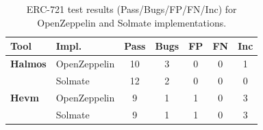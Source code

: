 \begin{table}[htb]
\centering
\begin{scriptsize}
\begin{tabular}{llccccc}
\toprule
\textbf{Tool} & \textbf{Impl.} & \textbf{Pass} & \textbf{Bugs} & \textbf{FP} & \textbf{FN} & \textbf{Inc} \\
\midrule
\textbf{Halmos} & OpenZeppelin & 10 & 3 & 0 & 0 & 1 \\
 & Solmate & 12 & 2 & 0 & 0 & 0 \\
\textbf{Hevm} & OpenZeppelin & 9 & 1 & 1 & 0 & 3 \\
 & Solmate & 9 & 1 & 1 & 0 & 3 \\
\bottomrule
\end{tabular}
\end{scriptsize}
\caption{ERC-721 test results (Pass/Bugs/FP/FN/Inc) for OpenZeppelin and Solmate implementations.}
\label{tab:test_results_erc721}
\end{table}

